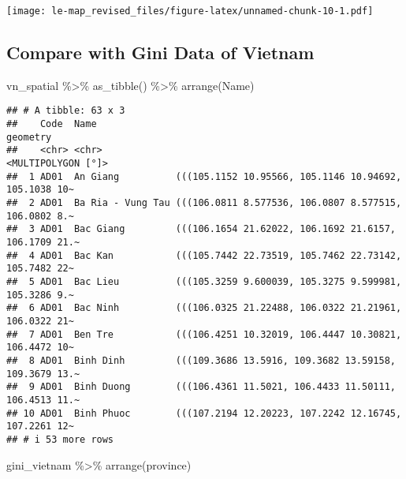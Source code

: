 \documentclass[
]{article}
\newenvironment{Shaded}{\begin{snugshade}}{\end{snugshade}}
\newcommand{\FunctionTok}[1]{\textcolor[rgb]{0.00,0.00,0.00}{#1}}
\newcommand{\NormalTok}[1]{#1}
\newcommand{\SpecialCharTok}[1]{\textcolor[rgb]{0.00,0.00,0.00}{#1}}
\begin{document}
\texttt{[image: le-map\_revised\_files/figure-latex/unnamed-chunk-10-1.pdf]}

\hypertarget{compare-with-gini-data-of-vietnam}{%
\subsection{Compare with Gini Data of
Vietnam}\label{compare-with-gini-data-of-vietnam}}

\begin{Shaded}
\begin{Highlighting}[]
\NormalTok{vn\_spatial }\SpecialCharTok{\%\textgreater{}\%} \FunctionTok{as\_tibble}\NormalTok{() }\SpecialCharTok{\%\textgreater{}\%} \FunctionTok{arrange}\NormalTok{(Name)}
\end{Highlighting}
\end{Shaded}

\begin{verbatim}
## # A tibble: 63 x 3
##    Code  Name                                                           geometry
##    <chr> <chr>                                                <MULTIPOLYGON [°]>
##  1 AD01  An Giang          (((105.1152 10.95566, 105.1146 10.94692, 105.1038 10~
##  2 AD01  Ba Ria - Vung Tau (((106.0811 8.577536, 106.0807 8.577515, 106.0802 8.~
##  3 AD01  Bac Giang         (((106.1654 21.62022, 106.1692 21.6157, 106.1709 21.~
##  4 AD01  Bac Kan           (((105.7442 22.73519, 105.7462 22.73142, 105.7482 22~
##  5 AD01  Bac Lieu          (((105.3259 9.600039, 105.3275 9.599981, 105.3286 9.~
##  6 AD01  Bac Ninh          (((106.0325 21.22488, 106.0322 21.21961, 106.0322 21~
##  7 AD01  Ben Tre           (((106.4251 10.32019, 106.4447 10.30821, 106.4472 10~
##  8 AD01  Binh Dinh         (((109.3686 13.5916, 109.3682 13.59158, 109.3679 13.~
##  9 AD01  Binh Duong        (((106.4361 11.5021, 106.4433 11.50111, 106.4513 11.~
## 10 AD01  Binh Phuoc        (((107.2194 12.20223, 107.2242 12.16745, 107.2261 12~
## # i 53 more rows
\end{verbatim}

\begin{Shaded}
\begin{Highlighting}[]
\NormalTok{gini\_vietnam }\SpecialCharTok{\%\textgreater{}\%} \FunctionTok{arrange}\NormalTok{(province)}
\end{Highlighting}
\end{Shaded}
\end{document}

